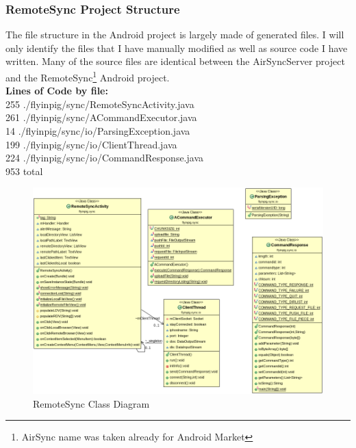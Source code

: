 \documentclass[12pt]{article}
\begin{document}
\subsubsection{RemoteSync Project Structure}

The file structure in the Android project is largely made of generated files. I will only identify the files that I have manually modified as well as source code I have written. Many of the source files are identical between the AirSyncServer project and the RemoteSync\footnote{AirSync name was taken already for Android Market} Android project.\\

\textbf{Lines of Code by file:}\\
  255 ./flyinpig/sync/RemoteSyncActivity.java\\
  261 ./flyinpig/sync/ACommandExecutor.java\\
   14 ./flyinpig/sync/io/ParsingException.java\\
  199 ./flyinpig/sync/io/ClientThread.java\\
  224 ./flyinpig/sync/io/CommandResponse.java\\
  953 total\\

\begin{figure}[H]
\center
\includegraphics[width=1\textwidth]{android-class-diag.png}
\caption{RemoteSync Class Diagram}
\end{figure}
\end{document}
